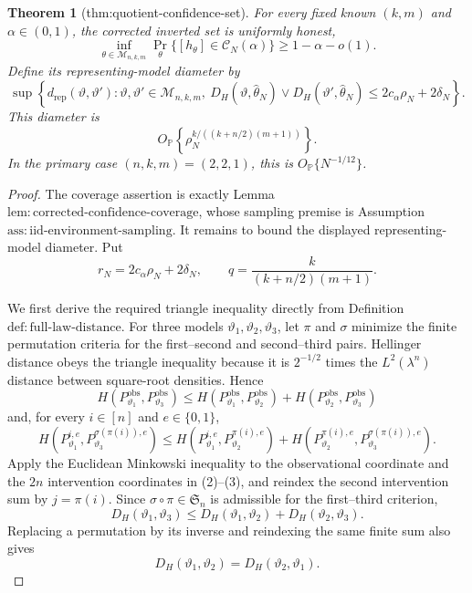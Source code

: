 \documentclass{article}
\newtheorem{theorem}{Theorem}
\begin{document}
\begin{theorem}[thm:quotient-confidence-set]\label{thm:quotient-confidence-set}
For every fixed known \( (k,m) \) and \( \alpha\in(0,1) \), the corrected inverted set is uniformly honest,
\[
\inf_{\theta\in\mathcal M_{n,k,m}}
\Pr_\theta\{[h_\theta]\in\mathcal C_N(\alpha)\}
\ge 1-\alpha-o(1).
\]
Define its representing-model diameter by
\[
\sup\left\{d_{\mathrm{rep}}(\vartheta,\vartheta'):
\vartheta,\vartheta'\in\mathcal M_{n,k,m},\
D_H(\vartheta,\widehat\theta_N)\vee
D_H(\vartheta',\widehat\theta_N)
\le 2c_\alpha\rho_N+2\delta_N\right\}.
\]
This diameter is
\[
O_{\mathbb P}\!\left\{\rho_N^{k/((k+n/2)(m+1))}\right\}.
\]
In the primary case \( (n,k,m)=(2,2,1) \), this is
\(O_{\mathbb P}\{N^{-1/12}\}\).
\end{theorem}
\begin{proof}
The coverage assertion is exactly Lemma \(\mathrm{lem:corrected\text{-}confidence\text{-}coverage}\), whose sampling premise is Assumption \(\mathrm{ass:iid\text{-}environment\text{-}sampling}\).  It remains to bound the displayed representing-model diameter.  Put
\[
 r_N=2c_\alpha\rho_N+2\delta_N,
 \qquad
 q=\frac{k}{(k+n/2)(m+1)}.
\tag{1}
\]

We first derive the required triangle inequality directly from Definition \(\mathrm{def:full\text{-}law\text{-}distance}\).  For three models \(\vartheta_1,\vartheta_2,\vartheta_3\), let \(\pi\) and \(\sigma\) minimize the finite permutation criteria for the first--second and second--third pairs.  Hellinger distance obeys the triangle inequality because it is \(2^{-1/2}\) times the \(L^2(\lambda^n)\) distance between square-root densities.  Hence
\[
 H(P_{\vartheta_1}^{\mathrm{obs}},P_{\vartheta_3}^{\mathrm{obs}})
 \leq H(P_{\vartheta_1}^{\mathrm{obs}},P_{\vartheta_2}^{\mathrm{obs}})
     +H(P_{\vartheta_2}^{\mathrm{obs}},P_{\vartheta_3}^{\mathrm{obs}})
\tag{2}
\]
and, for every \(i\in[n]\) and \(e\in\{0,1\}\),
\[
 H(P_{\vartheta_1}^{i,e},P_{\vartheta_3}^{\sigma(\pi(i)),e})
 \leq H(P_{\vartheta_1}^{i,e},P_{\vartheta_2}^{\pi(i),e})
     +H(P_{\vartheta_2}^{\pi(i),e},P_{\vartheta_3}^{\sigma(\pi(i)),e}).
\tag{3}
\]
Apply the Euclidean Minkowski inequality to the observational coordinate and the \(2n\) intervention coordinates in (2)--(3), and reindex the second intervention sum by \(j=\pi(i)\).  Since \(\sigma\circ\pi\in\mathfrak S_n\) is admissible for the first--third criterion,
\[
 D_H(\vartheta_1,\vartheta_3)
 \leq D_H(\vartheta_1,\vartheta_2)+D_H(\vartheta_2,\vartheta_3).
\tag{4}
\]
Replacing a permutation by its inverse and reindexing the same finite sum also gives
\[
 D_H(\vartheta_1,\vartheta_2)=D_H(\vartheta_2,\vartheta_1).
\tag{5}
\]


\end{proof}
\end{document}
